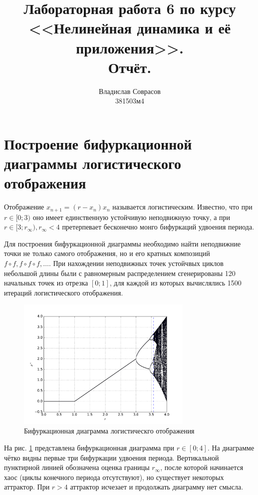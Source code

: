 \documentclass[a4paper]{article}
\begin{document}
\title{Лабораторная работа 6 по курсу <<Нелинейная динамика и её приложения>>. \\Отчёт.}
\author{Владислав Соврасов\\ 381503м4}
\date{}
\maketitle

\section{Построение бифуркационной диаграммы логистического отображения}

Отображение \(x_{n+1}=(r-x_n)x_n\) называется логистическим. Известно, что при \(r\in [0;3)\)
оно имеет единственную устойчивую неподвижную точку, а при \(r\in [3;r_\infty),r_\infty<4\)
претерпевает бесконечно монго бифуркаций удвоения периода.

Для построения бифуркационной диаграммы необходимо найти неподвижние точки не только самого отображения,
но и его кратных композиций \(f\circ f, f\circ f \circ f, \dots\).
При нахождении неподвижных точек устойчвых циклов небольшой длины были с равномерным распределением сгенерированы
120 начальных точек из отрезка \([0;1]\), для каждой из которых вычислялись 1500 итераций логистического отображения.

\begin{figure}[H]
	\center
	\includegraphics[width=0.75\textwidth]{../pictures/lab6_bifurcation_diagram.pdf}
	\caption{Бифуркационная диаграмма логистическго отображения}
	\label{fig:bifurcation_diagram}
\end{figure}

На рис. \ref{fig:bifurcation_diagram} представлена бифуркационная диаграмма при \(r\in[0;4]\).
На диаграмме чётко видны первые три бифуркации удвоения периода.
Вертикальной пунктирной линией обозначена оценка границы \(r_\infty\), после которой начинается
хаос (циклы конечного периода отсутствуют), но существует некоторых аттрактор.
При \(r>4\) аттрактор исчезает и продолжать диаграмму нет смысла.
\end{document}
